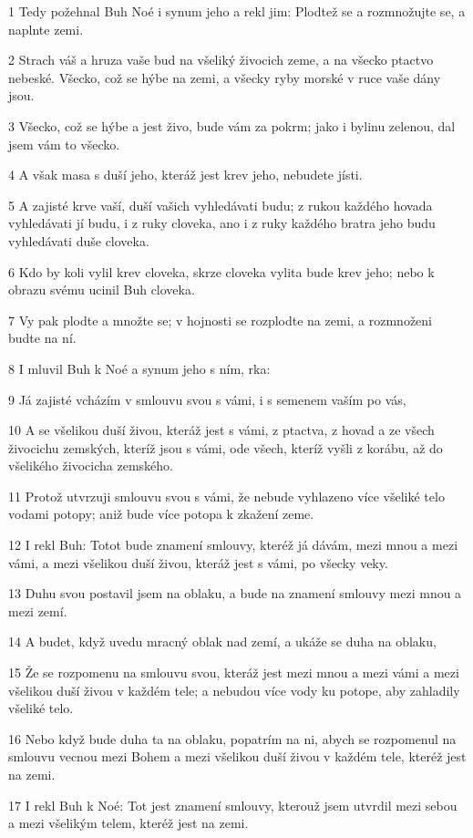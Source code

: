 \par 1 Tedy požehnal Buh Noé i synum jeho a rekl jim: Plodtež se a rozmnožujte se, a naplnte zemi.
\par 2 Strach váš a hruza vaše bud na všeliký živocich zeme, a na všecko ptactvo nebeské. Všecko, což se hýbe na zemi, a všecky ryby morské v ruce vaše dány jsou.
\par 3 Všecko, což se hýbe a jest živo, bude vám za pokrm; jako i bylinu zelenou, dal jsem vám to všecko.
\par 4 A však masa s duší jeho, kteráž jest krev jeho, nebudete jísti.
\par 5 A zajisté krve vaší, duší vašich vyhledávati budu; z rukou každého hovada vyhledávati jí budu, i z ruky cloveka, ano i z ruky každého bratra jeho budu vyhledávati duše cloveka.
\par 6 Kdo by koli vylil krev cloveka, skrze cloveka vylita bude krev jeho; nebo k obrazu svému ucinil Buh cloveka.
\par 7 Vy pak plodte a množte se; v hojnosti se rozplodte na zemi, a rozmnoženi budte na ní.
\par 8 I mluvil Buh k Noé a synum jeho s ním, rka:
\par 9 Já zajisté vcházím v smlouvu svou s vámi, i s semenem vaším po vás,
\par 10 A se všelikou duší živou, kteráž jest s vámi, z ptactva, z hovad a ze všech živocichu zemských, kteríž jsou s vámi, ode všech, kteríž vyšli z korábu, až do všelikého živocicha zemského.
\par 11 Protož utvrzuji smlouvu svou s vámi, že nebude vyhlazeno více všeliké telo vodami potopy; aniž bude více potopa k zkažení zeme.
\par 12 I rekl Buh: Totot bude znamení smlouvy, kteréž já dávám, mezi mnou a mezi vámi, a mezi všelikou duší živou, kteráž jest s vámi, po všecky veky.
\par 13 Duhu svou postavil jsem na oblaku, a bude na znamení smlouvy mezi mnou a mezi zemí.
\par 14 A budet, když uvedu mracný oblak nad zemí, a ukáže se duha na oblaku,
\par 15 Že se rozpomenu na smlouvu svou, kteráž jest mezi mnou a mezi vámi a mezi všelikou duší živou v každém tele; a nebudou více vody ku potope, aby zahladily všeliké telo.
\par 16 Nebo když bude duha ta na oblaku, popatrím na ni, abych se rozpomenul na smlouvu vecnou mezi Bohem a mezi všelikou duší živou v každém tele, kteréž jest na zemi.
\par 17 I rekl Buh k Noé: Tot jest znamení smlouvy, kterouž jsem utvrdil mezi sebou a mezi všelikým telem, kteréž jest na zemi.
